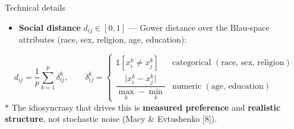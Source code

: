 \documentclass[aspectratio=169,11pt]{beamer}
\newcommand{\refn}[1]{{\color{ndgreen}[#1]}}
\newcommand{\emphr}[1]{{\color{ndreddark}\textbf{#1}}}
\begin{document}
\begin{frame}{Technical details}
\begin{itemize}
  \item \textbf{Social distance} $d_{ij}\in[0,1]$ — Gower distance over the Blau-space
        attributes (race, sex, religion, age, education):
\end{itemize}
\begin{equation*}
  d_{ij} = \frac{1}{p}\sum_{k=1}^{p} \delta_{ij}^{k},
  \qquad
  \delta_{ij}^{k} =
  \begin{cases}
    \mathbb{1}\!\left[x_i^{k}\neq x_j^{k}\right] & \text{categorical } (\text{race, sex, religion})\\[4pt]
    \dfrac{\big|x_i^{k}-x_j^{k}\big|}{\max_k - \min_k} & \text{numeric } (\text{age, education})
  \end{cases}
\end{equation*}
\vspace{0.3cm}
\footnotesize
* The idiosyncrasy that drives this is
\emphr{measured preference} and \emphr{realistic structure}, not stochastic noise
(Macy \& Evtushenko \refn{8}).
\end{frame}
\end{document}
